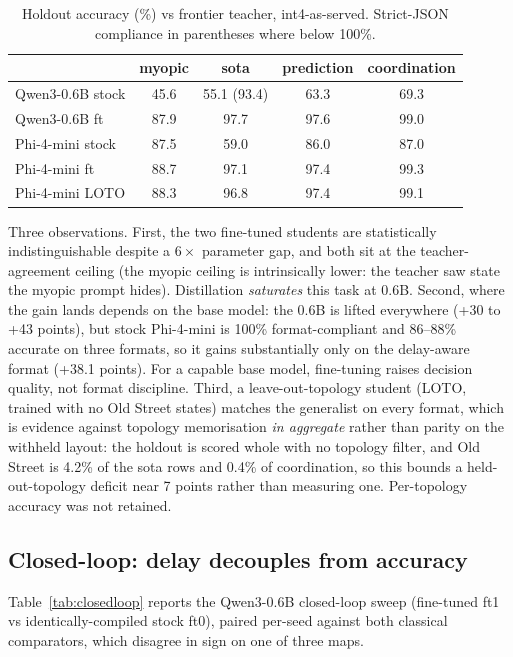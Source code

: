 \documentclass[conference]{IEEEtran}
\begin{document}
\begin{table}[t]
\caption{Holdout accuracy (\%) vs frontier teacher, int4-as-served.
Strict-JSON compliance in parentheses where below 100\%.}
\label{tab:offline}
\centering
\small
\begin{tabular}{lcccc}
\toprule
 & myopic & sota & prediction & coordination \\
\midrule
Qwen3-0.6B stock & 45.6 & 55.1 (93.4) & 63.3 & 69.3 \\
Qwen3-0.6B ft    & 87.9 & 97.7 & 97.6 & 99.0 \\
Phi-4-mini stock & 87.5 & 59.0 & 86.0 & 87.0 \\
Phi-4-mini ft    & 88.7 & 97.1 & 97.4 & 99.3 \\
Phi-4-mini LOTO  & 88.3 & 96.8 & 97.4 & 99.1 \\
\bottomrule
\end{tabular}
\end{table}

Three observations. First, the two fine-tuned students are statistically
indistinguishable despite a $6\times$ parameter gap, and both sit at the
teacher-agreement ceiling (the myopic ceiling is intrinsically lower: the
teacher saw state the myopic prompt hides). Distillation \emph{saturates}
this task at 0.6B. Second, where the gain lands depends on the base model:
the 0.6B is lifted everywhere (+30 to +43 points), but stock Phi-4-mini is
100\% format-compliant and 86--88\% accurate on three formats, so it gains
substantially only on the delay-aware format (+38.1 points). For a capable
base model, fine-tuning raises decision quality, not format discipline. Third,
a leave-out-topology student (LOTO, trained
with no Old Street states) matches the generalist on every format, which is
evidence against topology memorisation \emph{in aggregate} rather than
parity on the withheld layout: the holdout is scored whole with no topology
filter, and Old Street is 4.2\% of the sota rows and 0.4\% of coordination,
so this bounds a held-out-topology deficit near 7 points rather than
measuring one. Per-topology accuracy was not retained.

\subsection{Closed-loop: delay decouples from accuracy}
Table~\ref{tab:closedloop} reports the Qwen3-0.6B closed-loop sweep
(fine-tuned ft1 vs identically-compiled stock ft0), paired per-seed against
both classical comparators, which disagree in sign on one of three maps.
\end{document}
